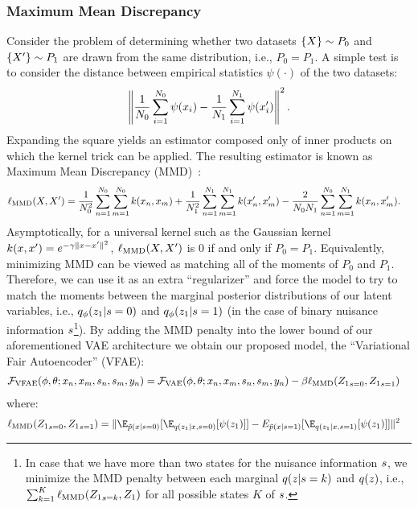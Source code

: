 \subsubsection{Maximum Mean Discrepancy}
Consider the problem of determining whether two datasets $\{ \*X \} \sim P_0$ and $\{ \*X' \} \sim P_1$ are drawn from the same distribution, i.e., $P_0 = P_1$. A simple test is to consider the distance between empirical statistics $\psi(\cdot)$ of the two datasets:
\begin{equation}
    \left \| \frac{1}{N_0} \sum_{i=1}^{N_0} \psi(\*x_i) - \frac{1}{N_1} \sum_{i=1}^{N_1} \psi(\*x'_i) \right \|^2. \label{eq:premmd}
\end{equation}
Expanding the square yields an estimator composed only of inner products on which the kernel trick can be applied. The resulting estimator is known as Maximum Mean Discrepancy (MMD)~\citep{gretton2006kernel}:
\begin{align}
    \ell_{\mathrm{MMD}}(\*X, \*X') &= \frac{1}{N_0^2} \sum_{n=1}^{N_0} \sum_{m=1}^{N_0} k(\*x_n, \*x_{m}) + \frac{1}{N_1^2} \sum_{n=1}^{N_1} \sum_{m=1}^{N_1} k(\*x'_n, \*x'_m) - \frac{2}{N_0 N_1} \sum_{n=1}^{N_0} \sum_{m=1}^{N_1} k(\*x_n, \*x'_m). \label{eq:mmd}
\end{align}
Asymptotically, for a universal kernel such as the Gaussian kernel $k(x,x')=e^{-\gamma \| \*x - \*x' \|^2}$, $\ell_{\mathrm{MMD}}(\*X, \*X')$ is $0$ if and only if $P_0 = P_1$. Equivalently, minimizing MMD can be viewed as matching all of the moments of $P_0$ and $P_1$.  Therefore, we can use it as an extra ``regularizer'' and force the model to try to match the moments between the marginal posterior distributions of our latent variables, i.e., $q_{\phi}(\*z_1|s=0)$ and $q_{\phi}(\*z_1| s=1)$ (in the case of binary nuisance information $\*s$\footnote{In case that we have more than two states for the nuisance information $\*s$, we minimize the MMD penalty between each marginal $q(\*z|\*s=k)$ and $q(\*z)$, i.e., $\sum_{k=1}^{K}\ell_{\mathrm{MMD}}({\*Z_1}_{\*s=k}, {\*Z_1})$ for all possible states $K$ of $\*s$.}). By adding the MMD penalty into the lower bound of our aforementioned VAE architecture we obtain our proposed model, the ``Variational Fair Autoencoder'' (VFAE):
\begin{align}
    \mathcal{F}_{\text{VFAE}}(\phi, \theta; \*x_n, \*x_m, \*s_n, \*s_m, \*y_n) & = \mathcal{F}_{\text{VAE}}(\phi, \theta; \*x_n, \*x_m, \*s_n, \*s_m, \*y_n) -\beta \ell_{\mathrm{MMD}}({\*Z_1}_{\*s=0}, {\*Z_1}_{\*s=1})
\end{align}
where:
\begin{align}
  \ell_{\mathrm{MMD}}({\*Z_1}_{\*s=0}, {\*Z_1}_{\*s=1}) & = \|\E_{\tilde{p}(\*x|\*s=0)}[\E_{q(\*z_1|\*x, \*s=0)}[\psi(\*z_1)]] - E_{\tilde{p}(\*x|\*s=1)}[\E_{q(\*z_1|\*x, \*s=1)}[\psi(\*z_1)]]\|^2
\end{align}

